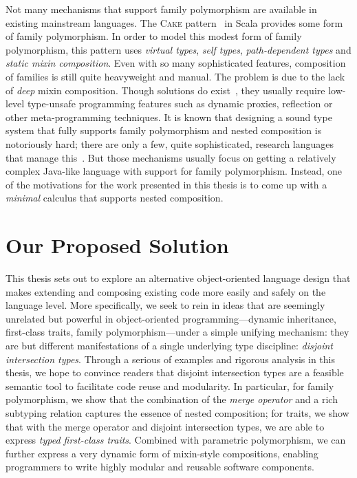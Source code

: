 Not many mechanisms that support family polymorphism are available in existing
mainstream languages. The \textsc{Cake} pattern~\citep{odersky2005scalable,
  Zenger-Odersky2005} in Scala provides some form of family polymorphism. In
order to model this modest form of family polymorphism, this pattern uses
\emph{virtual types}, \emph{self types}, \emph{path-dependent types} and
\emph{static mixin composition}. Even with so many sophisticated features,
composition of families is still quite heavyweight and manual. The problem is
due to the lack of \emph{deep} mixin composition. Though solutions do
exist~\citep{oliveira2013feature}, they usually require low-level type-unsafe
programming features such as dynamic proxies, reflection or other
meta-programming techniques. It is known that designing a sound type system that
fully supports family polymorphism and nested composition is notoriously hard;
there are only a few, quite sophisticated, research languages that manage
this~\citep{ErnstVirtual, Nystrom_2004, pubsdoc:tribe-virtual-calculus,SAITO_2007}.
But those mechanisms usually focus
on getting a relatively complex Java-like language with support for family polymorphism. Instead, one
of the motivations for the work presented in this thesis is to come up with a \textit{minimal} calculus that
supports nested composition.



\section{Our Proposed Solution}

This thesis sets out to explore an alternative object-oriented language design
that makes extending and composing existing code more easily and safely on the
language level. More specifically, we seek to rein in ideas that are seemingly
unrelated but powerful in object-oriented programming---dynamic inheritance,
first-class traits, family polymorphism---under a simple unifying mechanism:
they are but different manifestations of a single underlying type discipline:
\emph{disjoint intersection types}. Through a serious of examples and rigorous
analysis in this thesis, we hope to convince readers that disjoint intersection
types are a feasible semantic tool to facilitate code reuse and modularity. In
particular, for family polymorphism, we show that the combination of the
\emph{merge operator} and a rich subtyping relation captures the essence of
nested composition; for traits, we show that with the merge operator and
disjoint intersection types, we are able to express \emph{typed first-class
  traits}. Combined with parametric polymorphism, we can further
express a very dynamic form of mixin-style compositions, enabling programmers to write highly
modular and reusable software components.

